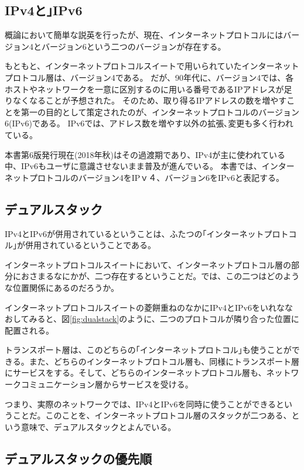 \subsection{IPv4と｣IPv6}
概論において簡単な説英を行ったが、現在、インターネットプロトコルにはバージョン4とバージョン6という二つのバージョンが存在する。

もともと、インターネットプロトコルスイートで用いられていたインターネットプロトコル層は、バージョン4である。
だが、90年代に、バージョン4では、各ホストやネットワークを一意に区別するのに用いる番号であるIPアドレスが足りなくなることが予想された。
そのため、取り得るIPアドレスの数を増やすことを第一の目的として策定されたのが、インターネットプロトコルのバージョン6(IPv6)である。
IPv6では、アドレス数を増やす以外の拡張､変更も多く行われている。

本書第6版発行現在(2018年秋)はその過渡期であり、IPv4が主に使われている中、IPv6もユーザに意識させないまま普及が進んでいる。
本書では、インターネットプロトコルのバージョン4をIPｖ４、バージョン6をIPv6と表記する。

\subsection{デュアルスタック}

IPv4とIPv6が併用されているということは、ふたつの｢インターネットプロトコル｣が併用されているということである。

インターネットプロトコルスイートにおいて、インターネットプロトコル層の部分におさまるなにかが、二つ存在するということだ。では、この二つはどのような位置関係にあるのだろうか。

インターネットプロトコルスイートの菱餅重ねのなかにIPv4とIPv6をいれななおしてみると、図\ref{fig:dualstack}のように、二つのプロトコルが隣り合った位置に配置される。

トランスポート層は、このどちらの｢インターネットプロトコル｣も使うことができる。また、どちらのインターネットプロトコル層も、同様にトランスポート層にサービスをする。そして、どちらのインターネットプロトコル層も、ネットワークコミュニケーション層からサービスを受ける。

つまり、実際のネットワークでは、IPv4とIPv6を同時に使うことができるということだ。このことを、インターネットプロトコル層のスタックが二つある、という意味で、デュアルスタックとよんでいる。

\subsection{デュアルスタックの優先順}

